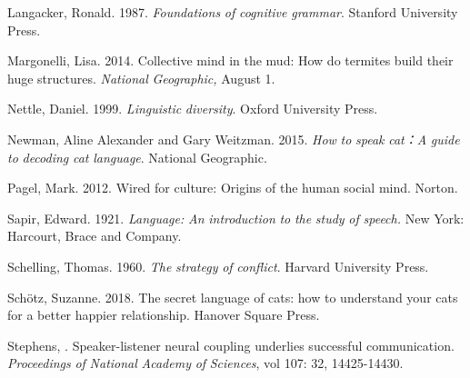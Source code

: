 \begin{stylereferences}
Langacker, Ronald. 1987. \textit{Foundations} \textit{of} \textit{cognitive} \textit{grammar}. Stanford University Press.
\end{stylereferences}

\begin{stylereferences}
Margonelli, Lisa. 2014. Collective mind in the mud: How do termites build their huge structures. \textit{National} \textit{Geographic,} August 1.
\end{stylereferences}

\begin{stylereferences}
Nettle, Daniel. 1999. \textit{Linguistic} \textit{diversity}. Oxford University Press.
\end{stylereferences}

\begin{stylereferences}
Newman, Aline Alexander and Gary Weitzman. 2015. \textit{How} \textit{to} \textit{speak} \textit{cat：A} \textit{guide} \textit{to} \textit{decoding} \textit{cat} \textit{language}. National Geographic.
\end{stylereferences}

\begin{stylereferences}
Pagel, Mark. 2012. Wired for culture: Origins of the human social mind. Norton.  
\end{stylereferences}

\begin{stylereferences}
Sapir, Edward. 1921. \textit{Language:} \textit{An} \textit{introduction} \textit{to} \textit{the} \textit{study} \textit{of} \textit{speech.} New York: Harcourt, Brace and Company.    
\end{stylereferences}

\begin{stylereferences}
Schelling, Thomas. 1960. \textit{The} \textit{strategy} \textit{of} \textit{conflict}. Harvard University Press.
\end{stylereferences}

\begin{stylereferences}
Schötz, Suzanne. 2018. The secret language of cats: how to understand your cats for a better happier relationship.  Hanover Square Press.
\end{stylereferences}

\begin{stylereferences}
Stephens, \citealt{GregEtAl2010}. Speaker-listener neural coupling underlies successful communication. \textit{Proceedings} \textit{of} \textit{National} \textit{Academy} \textit{of} \textit{Sciences}, vol 107: 32, 14425-14430.
\end{stylereferences}

